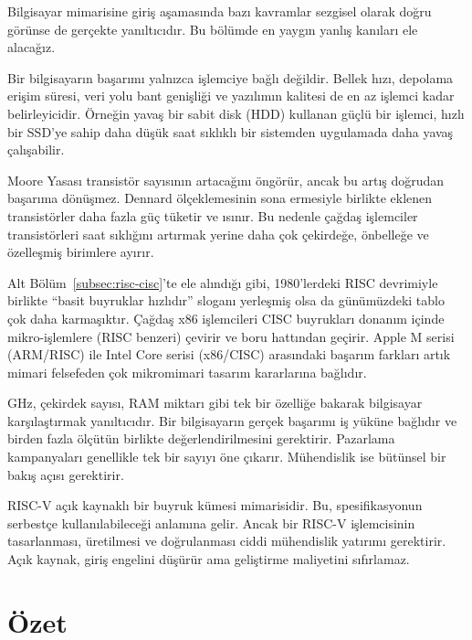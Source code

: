 Bilgisayar mimarisine giriş aşamasında bazı kavramlar sezgisel olarak doğru görünse de gerçekte yanıltıcıdır. Bu bölümde en yaygın yanlış kanıları ele alacağız.

Bir bilgisayarın başarımı yalnızca işlemciye bağlı değildir. Bellek hızı, depolama erişim süresi, veri yolu bant genişliği ve yazılımın kalitesi de en az işlemci kadar belirleyicidir. Örneğin yavaş bir sabit disk (HDD) kullanan güçlü bir işlemci, hızlı bir SSD'ye sahip daha düşük saat sıklıklı bir sistemden uygulamada daha yavaş çalışabilir.

Moore Yasası transistör sayısının artacağını öngörür, ancak bu artış doğrudan başarıma dönüşmez. Dennard ölçeklemesinin sona ermesiyle birlikte eklenen transistörler daha fazla güç tüketir ve ısınır. Bu nedenle çağdaş işlemciler transistörleri saat sıklığını artırmak yerine daha çok çekirdeğe, önbelleğe ve özelleşmiş birimlere ayırır.

Alt Bölüm~\ref{subsec:risc-cisc}'te ele alındığı gibi, 1980'lerdeki RISC devrimiyle birlikte ``basit buyruklar hızlıdır'' sloganı yerleşmiş olsa da günümüzdeki tablo çok daha karmaşıktır. Çağdaş x86 işlemcileri CISC buyrukları donanım içinde mikro-işlemlere (RISC benzeri) çevirir ve boru hattından geçirir. Apple M serisi (ARM/RISC) ile Intel Core serisi (x86/CISC) arasındaki başarım farkları artık mimari felsefeden çok mikromimari tasarım kararlarına bağlıdır.

GHz, çekirdek sayısı, RAM miktarı gibi tek bir özelliğe bakarak bilgisayar karşılaştırmak yanıltıcıdır. Bir bilgisayarın gerçek başarımı iş yüküne bağlıdır ve birden fazla ölçütün birlikte değerlendirilmesini gerektirir. Pazarlama kampanyaları genellikle tek bir sayıyı öne çıkarır. Mühendislik ise bütünsel bir bakış açısı gerektirir.

RISC-V açık kaynaklı bir buyruk kümesi mimarisidir. Bu, spesifikasyonun serbestçe kullanılabileceği anlamına gelir. Ancak bir RISC-V işlemcisinin tasarlanması, üretilmesi ve doğrulanması ciddi mühendislik yatırımı gerektirir. Açık kaynak, giriş engelini düşürür ama geliştirme maliyetini sıfırlamaz.


\section{Özet}
\label{sec:giris-ozet}


